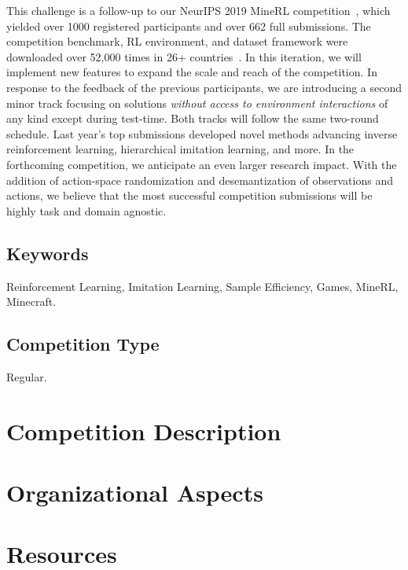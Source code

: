 \documentclass[11pt, oneside]{article}
\begin{document}
    This challenge is a follow-up to our NeurIPS 2019 MineRL competition~\cite{gussminerlneurips2019}, which yielded over 1000 registered participants and over 662 full submissions. The competition benchmark, RL environment, and dataset framework were downloaded over 52,000 times in 26+ countries~\cite{milani2020minerl}. 
        In this iteration, we will implement new features to expand the scale and reach of the competition. In response to the feedback of the previous participants, we are introducing a second minor track focusing on solutions \textit{without access to environment interactions} of any kind except during test-time. Both tracks will follow the same two-round schedule.
        Last year's top submissions developed novel methods advancing inverse reinforcement learning, hierarchical imitation learning, and more. In the forthcoming competition, we anticipate an even larger research impact. With the addition of action-space randomization and desemantization of observations and actions, we believe that the most successful competition submissions will be highly task and domain agnostic.

    
    
 

\subsection*{Keywords}
Reinforcement Learning, Imitation Learning, Sample Efficiency, Games, MineRL, Minecraft.
\subsection*{Competition Type} Regular.

\newpage 

\section{Competition Description}











\section{Organizational Aspects}




\section{Resources}



%


\end{document}
